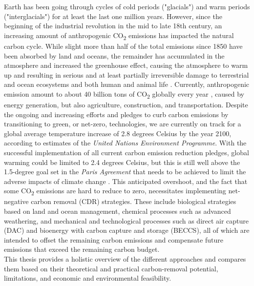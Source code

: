 Earth has been going through cycles of cold periods ("glacials") and warm periods ("interglacials") for at least the last one million years. However, since the beginning of the industrial revolution in the mid to late 18th century, an increasing amount of anthropogenic CO\textsubscript{2} emissions has impacted the natural carbon cycle. While slight more than half of the total emissions since 1850 have been absorbed by land and oceans, the remainder has accumulated in the atmosphere \parencite{Bergman2021TheJustice} and increased the greenhouse effect, causing the atmosphere to warm up and resulting in serious and at least partially irreversible damage to terrestrial and ocean ecosystems and both human and animal life \parencite[9]{IPCC2022SummaryPolicymakers}. Currently, anthropogenic emission amount to about 40 billion tons of CO\textsubscript{2} globally every year \parencite[4]{Friedlingstein2022Global2022}, caused by energy generation, but also agriculture, construction, and transportation. Despite the ongoing and increasing efforts and pledges to curb carbon emissions by transitioning to green, or net-zero, technologies, we are currently on track for a global average temperature increase of 2.8 degrees Celsius by the year 2100, according to estimates of the \textit{United Nations Environment Programme}. With the successful implementation of all current carbon emission reduction pledges, global warming could be limited to 2.4 degrees Celsius, but this is still well above the 1.5-degree goal set in the \textit{Paris Agreement} that needs to be achieved to limit the adverse impacts of climate change \parencite[35-36]{UNEP2022Emissions2022}. This anticipated overshoot, and the fact that some CO\textsubscript{2} emissions are hard to reduce to zero, necessitates implementing net-negative carbon removal (CDR) strategies. These include biological strategies based on land and ocean management, chemical processes such as advanced weathering, and mechanical and technological processes such as direct air capture (DAC) and bioenergy with carbon capture and storage (BECCS), all of which are intended to offset the remaining carbon emissions and compensate future emissions that exceed the remaining carbon budget.\\This thesis provides a holistic overview of the different approaches and compares them based on their theoretical and practical carbon-removal potential, limitations, and economic and environmental feasibility.